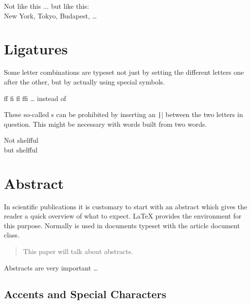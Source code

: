 \begin{chktexignore}
  \begin{example}
Not like this ...
but like this:\\
New York, Tokyo,
Budapest, \ldots
\end{example}
\end{chktexignore}

\section{Ligatures}

Some letter combinations are typeset not just by setting the
different letters one after the other, but by actually using special
symbols.
\begin{code}
{\large ff fi fl ffi \ldots}\quad
instead of
\end{code}
These so-called s can be prohibited by inserting an \texttt|\mbox{}|
between the two letters in question. This might be necessary with
words built from two words.

\begin{example}
\Large %
Not shelfful\\
but shelf\mbox{}ful
\end{example}

\section{Abstract}

In scientific publications it is customary to start with an abstract which
gives the reader a quick overview of what to expect. \LaTeX{} provides the
 environment for this purpose. Normally  is used
in documents typeset with the article document class.

\begin{example}[standalone, paperheight=3.5cm]
\begin{abstract}
  This paper will talk about
  abstracts.
\end{abstract}

Abstracts are very important \ldots
\end{example}

\subsection{Accents and Special Characters}

